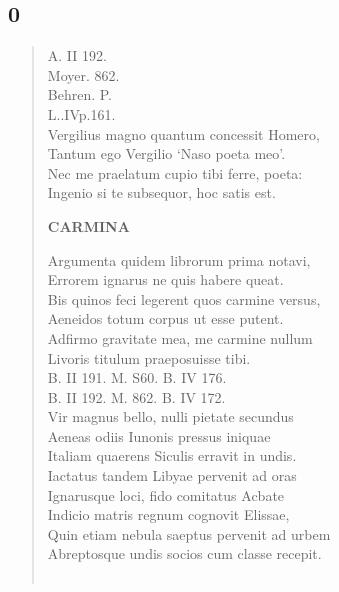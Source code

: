 \documentclass[11pt, a4paper]{report}
\begin{document}
            \subsection*{0}
      \begin{verse}
      A. II 192. \\ Moyer. 862. \\ Behren. P. \\ L..IVp.161. \\ Vergilius magno quantum concessit Homero, \\ Tantum ego Vergilio ‘Naso poeta meo’. \\ Nec me praelatum cupio tibi ferre, poeta: \\ Ingenio si te subsequor, hoc satis est. \\ \begin{center} \textbf{CARMINA} \end{center}Argumenta quidem librorum prima notavi, \\ Errorem ignarus ne quis habere queat. \\ Bis quinos feci legerent quos carmine versus, \\ Aeneidos totum corpus ut esse putent. \\ Adfirmo gravitate mea, me carmine nullum \\ Livoris titulum praeposuisse tibi. \\ B. II 191. M. S60. B. IV 176. \\ B. II 192. M. 862. B. IV 172. \\ Vir magnus bello, nulli pietate secundus \\ Aeneas odiis Iunonis pressus iniquae \\ Italiam quaerens Siculis erravit in undis. \\ Iactatus tandem Libyae pervenit ad oras \\ Ignarusque loci, fido comitatus Acbate \\ Indicio matris regnum cognovit Elissae, \\ Quin etiam nebula saeptus pervenit ad urbem \\ Abreptosque undis socios cum classe recepit. \\ 
        ﻿\pagebreak 

\end{verse}
\end{document}
